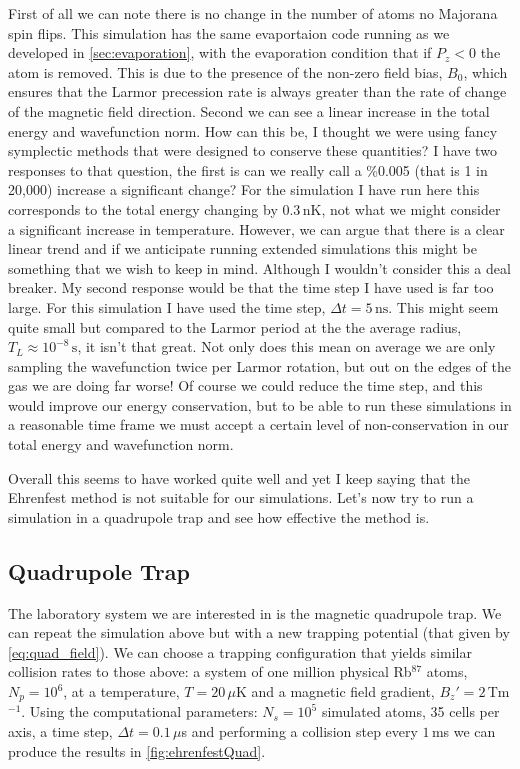First of all we can note there is no change in the number of atoms \ie no Majorana spin flips.
This simulation has the same evaportaion code running as we developed in \autoref{sec:evaporation}, with the evaporation condition that if $P_z < 0$ the atom is removed.
This is due to the presence of the non-zero field bias, $B_0$, which ensures that the Larmor precession rate is always greater than the rate of change of the magnetic field direction.
Second we can see a linear increase in the total energy and wavefunction norm.
How can this be, I thought we were using fancy symplectic methods that were designed to conserve these quantities?
I have two responses to that question, the first is can we really call a \%0.005 (that is 1 in 20,000) increase a significant change?
For the simulation I have run here this corresponds to the total energy changing by $0.3\,\mathrm{nK}$, not what we might consider a significant increase in temperature.
However, we can argue that there is a clear linear trend and if we anticipate running extended simulations this might be something that we wish to keep in mind.
Although I wouldn't consider this a deal breaker.
My second response would be that the time step I have used is far too large.
For this simulation I have used the time step, $\Delta t = 5\,\mathrm{ns}$.
This might seem quite small but compared to the Larmor period at the the average radius, $T_L\approx 10^{-8}\,\mathrm{s}$, it isn't that great.
Not only does this mean on average we are only sampling the wavefunction twice per Larmor rotation, but out on the edges of the gas we are doing far worse!
Of course we could reduce the time step, and this would improve our energy conservation, but to be able to run these simulations in a reasonable time frame we must accept a certain level of non-conservation in our total energy and wavefunction norm.

Overall this seems to have worked quite well and yet I keep saying that the Ehrenfest method is not suitable for our simulations.
Let's now try to run a simulation in a quadrupole trap and see how effective the method is.

\subsection{Quadrupole Trap} \label{sec:EhrenfestQuad}

The laboratory system we are interested in is the magnetic quadrupole trap.
We can repeat the simulation above but with a new trapping potential (that given by \autoref{eq:quad_field}). 
We can choose a trapping configuration that yields similar collision rates to those above: a system of one million physical Rb$^{87}$ atoms, $N_p = 10^6$, at a temperature, $T = 20\,\mu$K and a magnetic field gradient, $B_z' = 2\,$Tm$^{-1}$.
Using the computational parameters: $N_s=10^5$ simulated atoms, 35 cells per axis, a time step, $\Delta t = 0.1\,\mu$s and performing a collision step every $1\,$ms we can produce the results in \autoref{fig:ehrenfestQuad}.

